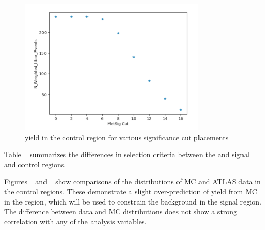 \begin{figure}[htbp]
    \centering
       \includegraphics[width = 0.80\textwidth]{Figures/4/ttbarCR/ttbar_metsig_placement.png}
       \caption{\ttbar yield in the \merged \ttbar control region for various \met significance cut placements}
       \label{fig:ttbar_metsig_placement}
\end{figure}

Table ~ summarizes the differences in selection criteria between the \merged and \resolved signal and \ttbar control regions.

Figures ~ and ~ show comparisons of the distributions of MC and ATLAS data in the \ttbar control regions. These demonstrate a slight over-prediction of yield from MC in the \merged region, which will be used to constrain the \ttbar background in the signal region. The difference between data and MC distributions does not show a strong correlation with any of the analysis variables.

